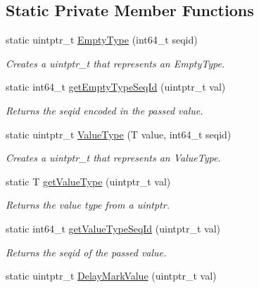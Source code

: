 \subsection*{Static Private Member Functions}
\begin{DoxyCompactItemize}
\item 
static uintptr\+\_\+t \hyperlink{classtervel_1_1containers_1_1wf_1_1_ring_buffer_ad29913ad7598a2825cd76200eef0f296}{Empty\+Type} (int64\+\_\+t seqid)
\begin{DoxyCompactList}\small\item\em Creates a uintptr\+\_\+t that represents an Empty\+Type. \end{DoxyCompactList}\item 
static int64\+\_\+t \hyperlink{classtervel_1_1containers_1_1wf_1_1_ring_buffer_ad28c5560eec05806c2a6c2c9d49b51df}{get\+Empty\+Type\+Seq\+Id} (uintptr\+\_\+t val)
\begin{DoxyCompactList}\small\item\em Returns the seqid encoded in the passed value. \end{DoxyCompactList}\item 
static uintptr\+\_\+t \hyperlink{classtervel_1_1containers_1_1wf_1_1_ring_buffer_a6d65a8409987f61a0fe48193b9073578}{Value\+Type} (T value, int64\+\_\+t seqid)
\begin{DoxyCompactList}\small\item\em Creates a uintptr\+\_\+t that represents an Value\+Type. \end{DoxyCompactList}\item 
static T \hyperlink{classtervel_1_1containers_1_1wf_1_1_ring_buffer_a1f068a3e3fb8afd732fb24629f9af573}{get\+Value\+Type} (uintptr\+\_\+t val)
\begin{DoxyCompactList}\small\item\em Returns the value type from a uintptr. \end{DoxyCompactList}\item 
static int64\+\_\+t \hyperlink{classtervel_1_1containers_1_1wf_1_1_ring_buffer_afcb8d6559b878ea259ad0d0c03260ce5}{get\+Value\+Type\+Seq\+Id} (uintptr\+\_\+t val)
\begin{DoxyCompactList}\small\item\em Returns the seqid of the passed value. \end{DoxyCompactList}\item 
static uintptr\+\_\+t \hyperlink{classtervel_1_1containers_1_1wf_1_1_ring_buffer_a82ae33c04b67eec192d19ec0e652012f}{Delay\+Mark\+Value} (uintptr\+\_\+t val)

\end{DoxyCompactItemize}
